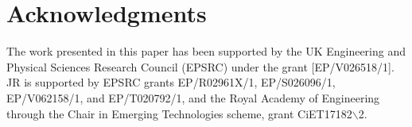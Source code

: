 \documentclass[lettersize,journal]{IEEEtran}
\begin{document}
\section*{Acknowledgments}
The work presented in this paper has been supported by the UK Engineering and Physical Sciences Research Council (EPSRC) under the grant [EP/V026518/1]. JR is supported by EPSRC grants EP/R02961X/1, EP/S026096/1, EP/V062158/1, and EP/T020792/1, and the Royal Academy of Engineering through the Chair in Emerging Technologies scheme, grant CiET17182$\backslash$2.




\newpage

\vfill
\end{document}
